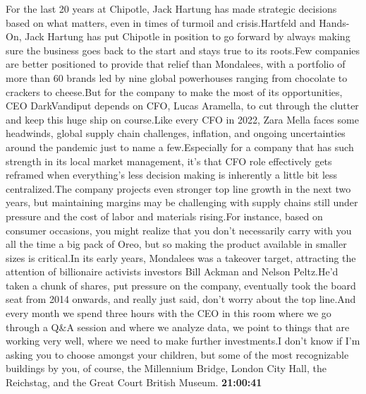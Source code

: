\documentclass{article}%
\begin{document}
For the last 20 years at Chipotle, Jack Hartung has made strategic decisions based on what matters, even in times of turmoil and crisis.Hartfeld and Hands{-}On, Jack Hartung has put Chipotle in position to go forward by always making sure the business goes back to the start and stays true to its roots.Few companies are better positioned to provide that relief than Mondalees, with a portfolio of more than 60 brands led by nine global powerhouses ranging from chocolate to crackers to cheese.But for the company to make the most of its opportunities, CEO DarkVandiput depends on CFO, Lucas Aramella, to cut through the clutter and keep this huge ship on course.Like every CFO in 2022, Zara Mella faces some headwinds, global supply chain challenges, inflation, and ongoing uncertainties around the pandemic just to name a few.Especially for a company that has such strength in its local market management, it's that CFO role effectively gets reframed when everything's less decision making is inherently a little bit less centralized.The company projects even stronger top line growth in the next two years, but maintaining margins may be challenging with supply chains still under pressure and the cost of labor and materials rising.For instance, based on consumer occasions, you might realize that you don't necessarily carry with you all the time a big pack of Oreo, but so making the product available in smaller sizes is critical.In its early years, Mondalees was a takeover target, attracting the attention of billionaire activists investors Bill Ackman and Nelson Peltz.He'd taken a chunk of shares, put pressure on the company, eventually took the board seat from 2014 onwards, and really just said, don't worry about the top line.And every month we spend three hours with the CEO in this room where we go through a Q\&A session and where we analyze data, we point to things that are working very well, where we need to make further investments.I don't know if I'm asking you to choose amongst your children, but some of the most recognizable buildings by you, of course, the Millennium Bridge, London City Hall, the Reichstag, and the Great Court British Museum.%
\textbf{21:00:41}%
\newline%
\end{document}
